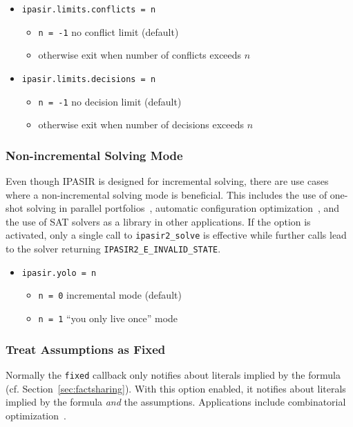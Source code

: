 \documentclass[sat]{iosart2x}
\begin{document}
\begin{itemize}
    \item \texttt{ipasir.limits.conflicts = n}
    \begin{itemize}
        \item \texttt{n = -1} no conflict limit (default)
        \item otherwise exit when number of conflicts exceeds $n$
    \end{itemize}
    \item \texttt{ipasir.limits.decisions = n}
    \begin{itemize}
        \item \texttt{n = -1} no decision limit (default)
        \item otherwise exit when number of decisions exceeds $n$
    \end{itemize}
\end{itemize}


\subsubsection{Non-incremental Solving Mode}
Even though IPASIR is designed for incremental solving, there are use cases where a non-incremental solving mode is beneficial.
This includes the use of one-shot solving in parallel portfolios~\cite{Hamadi:2010:ParallelPortfolio}, automatic configuration optimization~\cite{Hutter:2017:CSSC}, and the use of SAT solvers as a library in other applications.
If the option is activated, only a single call to \texttt{ipasir2\_solve} is effective while further calls lead to the solver returning \texttt{IPASIR2\_E\_INVALID\_STATE}.

\begin{itemize}
    \item \texttt{ipasir.yolo = n}
    \begin{itemize}
        \item \texttt{n = 0} incremental mode (default)
        \item \texttt{n = 1} ``you only live once'' mode
    \end{itemize}
\end{itemize}


\subsubsection{Treat Assumptions as Fixed}\label{sec:assumptionsfixed}
Normally the \texttt{fixed} callback only notifies about literals implied by the formula (cf. Section~\ref{sec:factsharing}).
With this option enabled, it notifies about literals implied by the formula \emph{and} the assumptions.
Applications include combinatorial optimization~\cite{Cohen:2021:LSOpt}.
\end{document}
